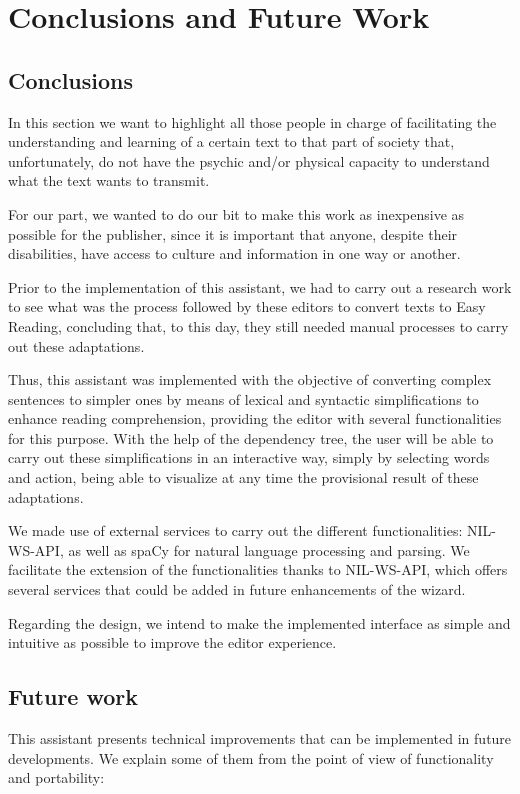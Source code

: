 \chapter{Conclusions and Future Work}
\label{cap:conclusions}

\section{Conclusions}
In this section we want to highlight all those people in charge of facilitating the understanding and learning of a certain text to that part of society that, unfortunately, do not have the psychic and/or physical capacity to understand what the text wants to transmit.

For our part, we wanted to do our bit to make this work as inexpensive as possible for the publisher, since it is important that anyone, despite their disabilities, have access to culture and information in one way or another.

Prior to the implementation of this assistant, we had to carry out a research work to see what was the process followed by these editors to convert texts to Easy Reading, concluding that, to this day, they still needed manual processes to carry out these adaptations.

Thus, this assistant was implemented with the objective of converting complex sentences to simpler ones by means of lexical and syntactic simplifications to enhance reading comprehension, providing the editor with several functionalities for this purpose. With the help of the dependency tree, the user will be able to carry out these simplifications in an interactive way, simply by selecting words and action, being able to visualize at any time the provisional result of these adaptations.

We made use of external services to carry out the different functionalities: NIL-WS-API, as well as spaCy for natural language processing and parsing. We facilitate the extension of the functionalities thanks to NIL-WS-API, which offers several services that could be added in future enhancements of the wizard.

Regarding the design, we intend to make the implemented interface as simple and intuitive as possible to improve the editor experience.

\section{Future work}
This assistant presents technical improvements that can be implemented in future developments. We explain some of them from the point of view of functionality and portability:

